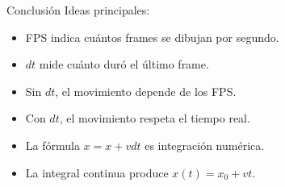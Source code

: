 \documentclass{beamer}
\begin{document}
\begin{frame}{Conclusión}
Ideas principales:

\begin{itemize}
    \item FPS indica cuántos frames se dibujan por segundo.
    \item \(dt\) mide cuánto duró el último frame.
    \item Sin \(dt\), el movimiento depende de los FPS.
    \item Con \(dt\), el movimiento respeta el tiempo real.
    \item La fórmula \(x=x+vdt\) es integración numérica.
    \item La integral continua produce \(x(t)=x_0+vt\).
\end{itemize}
\end{frame}
\end{document}
